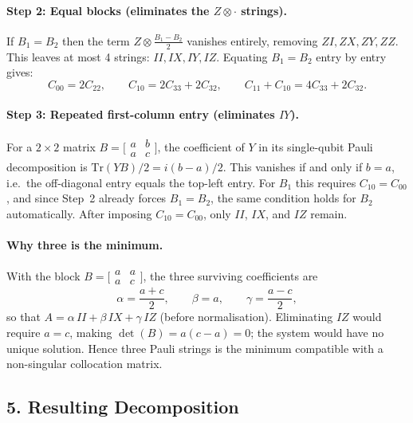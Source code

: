 \documentclass{article}
\begin{document}
\paragraph{Step 2: Equal blocks (eliminates the $Z\otimes\cdot$ strings).}
If $B_1 = B_2$ then the term $Z \otimes \tfrac{B_1-B_2}{2}$ vanishes entirely, removing
$ZI, ZX, ZY, ZZ$.  This leaves at most 4 strings: $II, IX, IY, IZ$.
Equating $B_1 = B_2$ entry by entry gives:
\begin{equation}
    C_{00} = 2C_{22}, \qquad
    C_{10} = 2C_{33}+2C_{32}, \qquad
    C_{11}+C_{10} = 4C_{33}+2C_{32}.
\end{equation}

\paragraph{Step 3: Repeated first-column entry (eliminates $IY$).}
For a $2\times 2$ matrix $B = \bigl[\begin{smallmatrix}a&b\\a&c\end{smallmatrix}\bigr]$,
the coefficient of $Y$ in its single-qubit Pauli decomposition is
$\mathrm{Tr}(Y B)/2 = i(b-a)/2$.
This vanishes if and only if $b = a$, i.e.\ the off-diagonal entry equals the top-left entry.
For $B_1$ this requires $C_{10} = C_{00}$, and since Step~2 already forces $B_1 = B_2$,
the same condition holds for $B_2$ automatically.
After imposing $C_{10} = C_{00}$, only $II$, $IX$, and $IZ$ remain.

\paragraph{Why three is the minimum.}
With the block $B = \bigl[\begin{smallmatrix}a&a\\a&c\end{smallmatrix}\bigr]$, the three
surviving coefficients are
\begin{equation}
    \alpha = \frac{a+c}{2}, \qquad \beta = a, \qquad \gamma = \frac{a-c}{2},
\end{equation}
so that $A = \alpha\, II + \beta\, IX + \gamma\, IZ$ (before normalisation).
Eliminating $IZ$ would require $a = c$, making $\det(B) = a(c-a) = 0$; the system
would have no unique solution.  Hence three Pauli strings is the minimum compatible
with a non-singular collocation matrix.

\subsection*{5. Resulting Decomposition}
\end{document}
